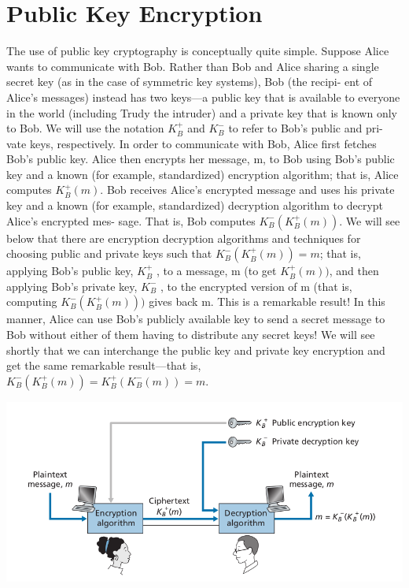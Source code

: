 \documentclass{report}
\theoremstyle{definition}
\begin{document}
{{\section{Public Key Encryption}
\Large{The use of public key cryptography is conceptually quite simple. Suppose Alice
wants to communicate with Bob. Rather than Bob and Alice
sharing a single secret key (as in the case of symmetric key systems), Bob (the recipi-
ent of Alice’s messages) instead has two keys—a public key that is available to
everyone in the world (including Trudy the intruder) and a private key that is known
only to Bob. We will use the notation $K_B^+$ and $K_B^-$ to refer to Bob’s public and pri-
vate keys, respectively. In order to communicate with Bob, Alice first fetches Bob’s
public key. Alice then encrypts her message, m, to Bob using Bob’s public key and
a known (for example, standardized) encryption algorithm; that is, Alice computes
$K_B^+ (m)$. Bob receives Alice’s encrypted message and uses his private key and a known
(for example, standardized) decryption algorithm to decrypt Alice’s encrypted mes-
sage. That is, Bob computes $K_B^- (K_B^+ (m))$. We will see below that there are encryption
decryption algorithms and techniques for choosing public and private keys such that
$K_B^- (K_B^+ (m)) = m$; that is, applying Bob’s public key, $K_B^+$ , to a message, m (to get
$K_B^+ (m))$, and then applying Bob’s private key, $K_B^-$ , to the encrypted version of m (that
is, computing $K_B^- (K_B^+ (m)))$ gives back m. This is a remarkable result! In this manner,
Alice can use Bob’s publicly available key to send a secret message to Bob without
either of them having to distribute any secret keys! We will see shortly that we can
interchange the public key and private key encryption and get the same remarkable
result––that is, $K_B^- (K_B^+ (m)) = K_B^+ (K_B^- (m)) = m$.
}
\newline
\newline

\includegraphics[scale=0.5]{"keygen.png"}

}}
\end{document}
